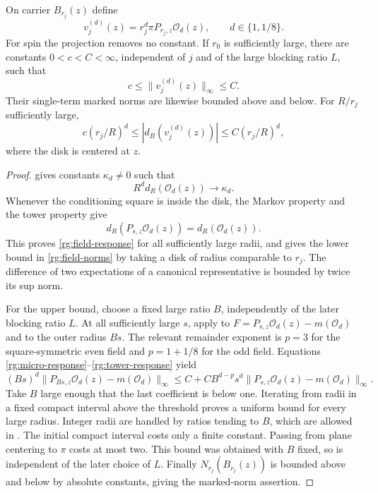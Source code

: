 \begin{lemma}
\label{rg:fields}
On carrier $B_{r_j}(z)$ define
\begin{equation}
 v_j^{(d)}(z)=r_j^d\pi P_{r_j,z}\mathcal O_d(z),
 \qquad d\in\{1,1/8\}.
 \label{rg:distinguished}
\end{equation}
For spin the projection removes no constant.  If $r_0$ is sufficiently
large, there are constants $0<c<C<\infty$, independent of $j$ and of the
large blocking ratio $L$, such that
\begin{equation}
 c\le\|v_j^{(d)}(z)\|_\infty\le C.
 \label{rg:field-norms}
\end{equation}
Their single-term marked norms are likewise bounded above and below.
For $R/r_j$ sufficiently large,
\begin{equation}
 c(r_j/R)^d\le |d_R(v_j^{(d)}(z))|
                    \le C(r_j/R)^d,
 \label{rg:field-response}
\end{equation}
where the disk is centered at $z$.
\end{lemma}

\begin{proof}
 gives constants $\kappa_d\ne0$ such that
\begin{equation}
 R^d d_R(\mathcal O_d(z))\longrightarrow\kappa_d.
 \label{rg:micro-response}
\end{equation}
Whenever the conditioning square is inside the disk, the Markov property
and the tower property give
\begin{equation}
 d_R(P_{s,z}\mathcal O_d(z))=d_R(\mathcal O_d(z)).
 \label{rg:tower-response}
\end{equation}
This proves \eqref{rg:field-response} for all sufficiently large radii,
and gives the lower bound in \eqref{rg:field-norms} by taking a disk of
radius comparable to $r_j$.  The difference of two expectations of a
canonical representative is bounded by twice its sup norm.

For the upper bound, choose a fixed large ratio $B$, independently of the
later blocking ratio $L$.  At all sufficiently large $s$, apply
 to
$F=P_{s,z}\mathcal O_d(z)-m(\mathcal O_d)$ and to the outer radius $Bs$.
The relevant remainder exponent is $p=3$ for the square-symmetric even
field and $p=1+1/8$ for the odd field.  Equations
\eqref{rg:micro-response}--\eqref{rg:tower-response} yield
\[
 (Bs)^d\|P_{Bs,z}\mathcal O_d(z)-m(\mathcal O_d)\|_\infty
 \le C+C B^{d-p}
       s^d\|P_{s,z}\mathcal O_d(z)-m(\mathcal O_d)\|_\infty.
\]
Take $B$ large enough that the last coefficient is below one.  Iterating
from radii in a fixed compact interval above the threshold proves a
uniform bound for every large radius.  Integer radii are handled by
ratios tending to $B$, which are allowed in .  The
initial compact interval costs only a finite constant.  Passing from
plane centering to $\pi$ costs at most two.  This bound was obtained with
$B$ fixed, so is independent of the later choice of $L$.
Finally $N_{r_j}(B_{r_j}(z))$ is bounded above and below by absolute
constants, giving the marked-norm assertion.
\end{proof}

